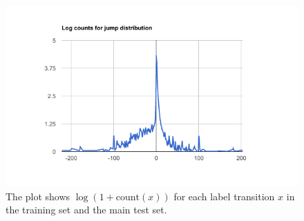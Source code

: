 
\begin{figure}
    \centering
    \includegraphics[scale=0.7]{resources/jump_log_counts.png}
    \caption{The plot shows $\log(1+\text{count}(x))$ for each label transition $x$ in the training set and the main test set.
    }
    \label{fig:jump_log_counts}
\end{figure}

